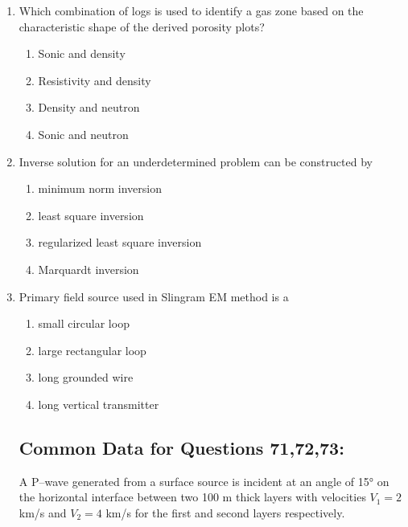 \documentclass[journal,12pt,onecolumn]{IEEEtran}
\theoremstyle{remark}
\begin{document}
\begin{enumerate}[resume]
\item Which combination of logs is used to identify a gas zone based on the characteristic shape of the derived porosity plots?

\begin{multicols}{2}
\begin{enumerate}
\item Sonic and density  
\item Resistivity and density  
\item Density and neutron  
\item Sonic and neutron  
\end{enumerate}
\end{multicols}
\vspace{0.5cm}

\item Inverse solution for an underdetermined problem can be constructed by

\begin{multicols}{2}
\begin{enumerate}
\item minimum norm inversion  
\item least square inversion  
\item regularized least square inversion  
\item Marquardt inversion  
\end{enumerate}
\end{multicols}
\vspace{0.5cm}

\item Primary field source used in Slingram EM method is a

\begin{multicols}{2}
\begin{enumerate}
\item small circular loop  
\item large rectangular loop  
\item long grounded wire  
\item long vertical transmitter  
\end{enumerate}
\end{multicols}
\vspace{0.5cm}

\subsection*{Common Data for Questions 71,72,73:}
A P--wave generated from a surface source is incident at an angle of 15° on the horizontal interface between two 100 m thick layers with velocities $V_1 = 2$ km/s and $V_2 = 4$ km/s for the first and second layers respectively.
\vspace{0.5cm}


\end{enumerate}
\end{document}
